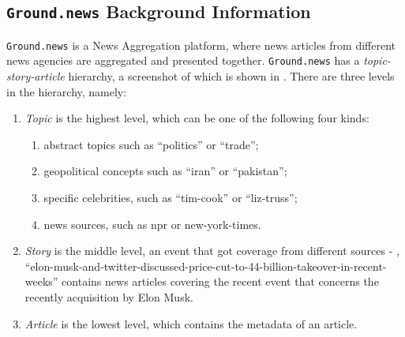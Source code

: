 \subsection{\texttt{Ground.news} Background Information}
\label{ground-news}
\texttt{Ground.news} is a News Aggregation platform, where news articles from different news agencies are aggregated and presented together. \texttt{Ground.news} has a \textit{topic-story-article} hierarchy, a screenshot of which is shown in . There are three levels in the hierarchy, namely:
\begin{enumerate}
    \item \textit{Topic} is the highest level, which can be one of the following four kinds:
    \begin{enumerate}
        \item abstract topics such as ``politics'' or ``trade'';
        \item geopolitical concepts such as ``iran'' or ``pakistan'';
        \item specific celebrities, such as ``tim-cook'' or ``liz-truss'';
        \item news sources, such as npr or new-york-times.
    \end{enumerate}
    \item \textit{Story} is the middle level, an event that got coverage from different sources - \eg, ``elon-musk-and-twitter-discussed-price-cut-to-44-billion-takeover-in-recent-weeks'' contains news articles covering the recent event that concerns the recently acquisition by Elon Musk.
    \item \textit{Article} is the lowest level, which contains the metadata of an article.
\end{enumerate}
